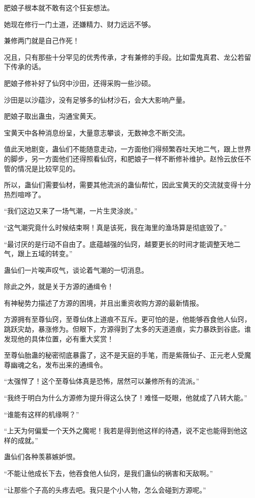 \begin{this_body}
肥娘子根本就不敢有这个狂妄想法。

她现在修行一门土道，还嫌精力、财力远远不够。

兼修两门就是自己作死！

况且，只有那些十分罕见的优秀传承，才有兼修的手段。比如雷鬼真君、龙公若留下传承的话。

肥娘子修补好了仙窍中沙田，还得采购一些沙硕。

沙田是以沙蕴沙，没有足够多的仙材沙石，会大大影响产量。

肥娘子取出蛊虫，沟通宝黄天。

宝黄天中各种消息纷呈，大量意志攀谈，无数神念不断交流。

值此天地剧变，蛊仙们不能随意走动，一方面他们得频繁吞吐天地二气，跟上世界的脚步，另一方面他们还得照看仙窍，和肥娘子一样不断修补维护。赵怜云放任不管的情况是比较罕见的。

所以，蛊仙们需要仙材，需要其他流派的蛊仙帮忙，因此宝黄天的交流就变得十分热烈喧哗了。

“我们这边又来了一场气潮，一片生灵涂炭。”

“这气潮究竟什么时候结束啊！真是该死，我在海里的渔场算是彻底毁了。”

“最讨厌的是行动不自由了。底蕴越强的仙窍，越要更长的时间才能调整天地二气，跟上五域的转变。”

蛊仙们一片唉声叹气，谈论着气潮的一切消息。

除此之外，就是关于方源的通缉令！

有神秘势力描述了方源的困境，并且出重资收购方源的最新情报。

方源拥有至尊仙窍，至尊仙体上道痕不互斥。更可怕的是，他能够吞食他人仙窍，跳跃灾劫，暴涨修为。但眼下，方源得到了太多的天道道痕，实力暴跌到谷底。谁发现他的具体位置，必有重大奖赏！

至尊仙胎蛊的秘密彻底暴露了，这不是天庭的手笔，而是紫薇仙子、正元老人受魔尊幽魂之名，发布出来的通缉令。

“太强悍了！这个至尊仙体真是恐怖，居然可以兼修所有的流派。”

“我终于明白为什么方源修为提升得这么快了！难怪一眨眼，他就成了八转大能。”

“谁能有这样的机缘啊？”

“上天为何偏爱一个天外之魔呢！我若是得到他这样的待遇，说不定也能得到他这样的成就。”

蛊仙们各种羡慕嫉妒恨。

“不能让他成长下去，他吞食他人仙窍，是我们蛊仙的祸害和天敌啊。”

“让那些个子高的头疼去吧。我只是个小人物，怎么会碰到方源呢。”


\end{this_body}
